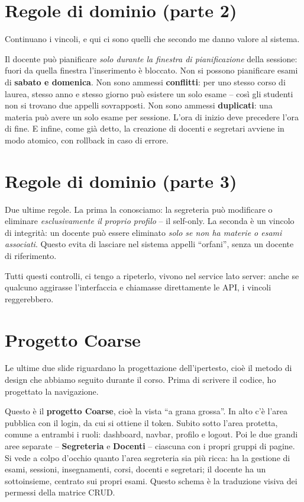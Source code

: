 \documentclass[11pt]{article}
\begin{document}
\section*{Regole di dominio (parte 2)}

Continuano i vincoli, e qui ci sono quelli che secondo me danno valore al sistema.

Il docente può pianificare \emph{solo durante la finestra di pianificazione} della
sessione: fuori da quella finestra l'inserimento è bloccato. Non si possono pianificare
esami di \textbf{sabato e domenica}. Non sono ammessi \textbf{conflitti}: per uno stesso
corso di laurea, stesso anno e stesso giorno può esistere un solo esame -- così gli
studenti non si trovano due appelli sovrapposti. Non sono ammessi \textbf{duplicati}: una
materia può avere un solo esame per sessione. L'ora di inizio deve precedere l'ora di
fine. E infine, come già detto, la creazione di docenti e segretari avviene in modo
atomico, con rollback in caso di errore.

\section*{Regole di dominio (parte 3)}

Due ultime regole. La prima la conosciamo: la segreteria può modificare o eliminare
\emph{esclusivamente il proprio profilo} -- il self-only. La seconda è un vincolo di
integrità: un docente può essere eliminato \emph{solo se non ha materie o esami
associati}. Questo evita di lasciare nel sistema appelli ``orfani'', senza un docente di
riferimento.

Tutti questi controlli, ci tengo a ripeterlo, vivono nel service lato server: anche se
qualcuno aggirasse l'interfaccia e chiamasse direttamente le API, i vincoli reggerebbero.

\section*{Progetto Coarse}

Le ultime due slide riguardano la progettazione dell'ipertesto, cioè il metodo di design
che abbiamo seguito durante il corso. Prima di scrivere il codice, ho progettato la
navigazione.

Questo è il \textbf{progetto Coarse}, cioè la vista ``a grana grossa''. In alto c'è
l'area pubblica con il login, da cui si ottiene il token. Subito sotto l'area protetta,
comune a entrambi i ruoli: dashboard, navbar, profilo e logout. Poi le due grandi aree
separate -- \textbf{Segreteria} e \textbf{Docenti} -- ciascuna con i propri gruppi di
pagine. Si vede a colpo d'occhio quanto l'area segreteria sia più ricca: ha la gestione
di esami, sessioni, insegnamenti, corsi, docenti e segretari; il docente ha un
sottoinsieme, centrato sui propri esami. Questo schema è la traduzione visiva dei
permessi della matrice CRUD.
\end{document}
